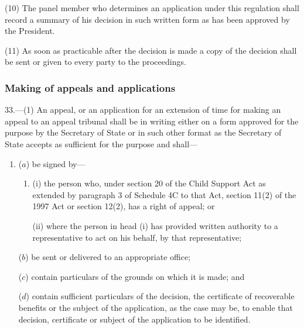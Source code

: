 \documentclass[12pt,a4paper]{article}
\begin{document}
(10) The panel member who determines an application under this regulation shall record a summary of his decision in such written form as has been approved by the President.

(11) As soon as practicable after the decision is made a copy of the decision shall be sent or given to every party to the proceedings.

\subsubsection[33. Making of appeals and applications]{Making of appeals and applications}

33.—(1) An appeal, or an application for an extension of time for making an appeal to an appeal tribunal shall be in writing either on a form approved for the purpose by the Secretary of State or in such other format as the Secretary of State accepts as sufficient for the purpose and shall—
\begin{enumerate}\item[]
($a$) be signed by—
\begin{enumerate}\item[]
(i) the person who, under section 20 of the Child Support Act as extended by paragraph 3 of Schedule 4C to that Act, section 11(2) of the 1997 Act or section 12(2), has a right of appeal; or

(ii) where the person in head (i) has provided written authority to a representative to act on his behalf, by that representative;
\end{enumerate}

($b$) be sent or delivered to an appropriate office;

($c$) contain particulars of the grounds on which it is made; and

($d$) contain sufficient particulars of the decision, the certificate of recoverable benefits or the subject of the application, as the case may be, to enable that decision, certificate or subject of the application to be identified.
\end{enumerate}
\end{document}
